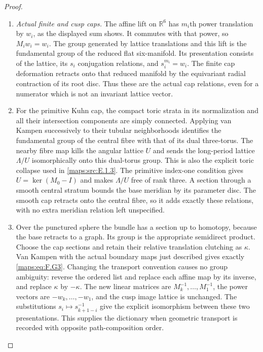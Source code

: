 \documentclass[11pt,a4paper]{article}
\theoremstyle{definition}
\begin{document}
\begin{proof}
\begin{enumerate}[label=\arabic*.]
\item \emph{Actual finite and cusp caps.}
The affine lift on $\mathbb R^6$ has $m_i$th power translation by
$w_i$, as the displayed sum shows.  It commutes with that power,
so $M_iw_i=w_i$.  The group generated by lattice translations
and this lift is the fundamental group of the reduced flat
six-manifold.  Its presentation consists of the lattice, its
$s_i$ conjugation relations, and $s_i^{m_i}=w_i$.
The finite cap deformation retracts onto that reduced manifold
by the equivariant radial contraction of its root disc.
Thus these are the actual cap relations, even for a numerator
which is not an invariant lattice vector.

\item For the primitive Kuhn cap, the compact toric strata in its
normalization and all their intersection components are simply
connected.  Applying van Kampen successively to their tubular
neighborhoods identifies the fundamental group of the central
fibre with that of its dual three-torus.  The nearby fibre map
kills the angular lattice $U$ and sends the long-period lattice
$\Lambda/U$ isomorphically onto this dual-torus group.  This is
also the explicit toric collapse used in \ref{maps:src:E.1.3}.  The primitive
index-one condition gives $U=\ker(M_0-I)$ and makes $\Lambda/U$
free of rank three.  A section through a smooth central stratum
bounds the base meridian by its parameter disc.  The smooth cap
retracts onto the central fibre, so it adds exactly these
relations, with no extra meridian relation left unspecified.

\item Over the punctured sphere the bundle has a section up to homotopy,
because the base retracts to a graph.  Its group is the appropriate
semidirect product.  Choose the cap sections and retain their
relative translation clutching as $\kappa$.  Van Kampen with the
actual boundary maps just described gives exactly \eqref{maps:eq:F.G3}.
Changing the transport convention causes no group ambiguity:
reverse the ordered list and replace each affine map by its
inverse, and replace $\kappa$ by $-\kappa$.  The new linear
matrices are $M_k^{-1},\ldots,M_1^{-1}$, the power vectors are
$-w_k,\ldots,-w_1$, and the cusp image lattice is unchanged.
The substitutions $s_i\mapsto s_{k+1-i}^{-1}$ give the explicit
isomorphism between these two presentations.  This supplies the
dictionary when geometric transport is recorded with opposite
path-composition order.


\end{enumerate}
\end{proof}
\end{document}
